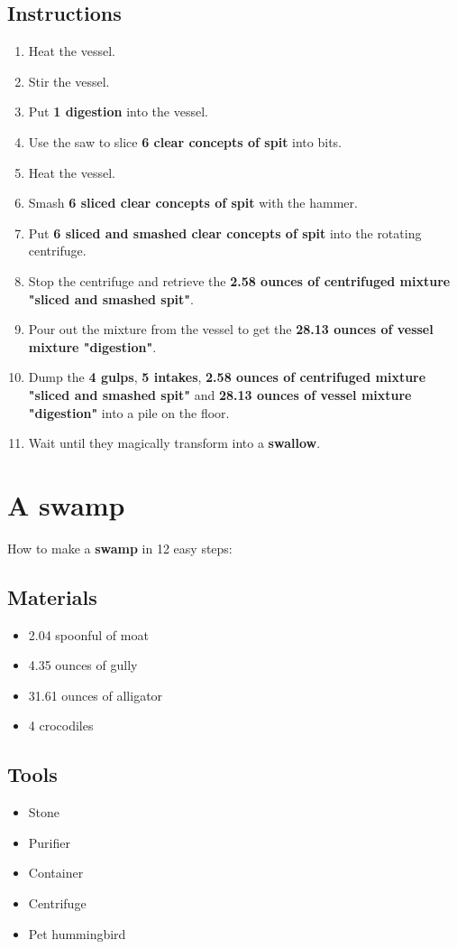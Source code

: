 \documentclass{article}
\begin{document}
\subsection{Instructions}\begin{enumerate}
\item 
Heat the vessel.
\item 
Stir the vessel.
\item 
Put \textbf{1 digestion} into the vessel.
\item 
Use the saw to slice \textbf{6 clear concepts of spit} into bits.
\item 
Heat the vessel.
\item 
Smash \textbf{6 sliced clear concepts of spit} with the hammer.
\item 
Put \textbf{6 sliced and smashed clear concepts of spit} into the rotating centrifuge.
\item 
Stop the centrifuge and retrieve the \textbf{2.58 ounces of centrifuged mixture "sliced and smashed spit"}.
\item 
Pour out the mixture from the vessel to get the \textbf{28.13 ounces of vessel mixture "digestion"}.
\item 
Dump the \textbf{4 gulps}, \textbf{5 intakes}, \textbf{2.58 ounces of centrifuged mixture "sliced and smashed spit"} and \textbf{28.13 ounces of vessel mixture "digestion"} into a pile on the floor.
\item 
Wait until they magically transform into a \textbf{swallow}.
\end{enumerate}
\newpage
\section{A swamp}How to make a \textbf{swamp} in 12 easy steps:

\subsection{Materials}\begin{itemize}
\item 
2.04 spoonful of moat
\item 
4.35 ounces of gully
\item 
31.61 ounces of alligator
\item 
4 crocodiles
\end{itemize}
\subsection{Tools}\begin{itemize}
\item 
Stone
\item 
Purifier
\item 
Container
\item 
Centrifuge
\item 
Pet hummingbird
\end{itemize}
\end{document}

